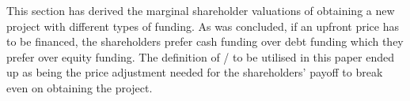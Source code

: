 \documentclass[main.tex]{subfiles}
\begin{document}
    This section has derived the marginal shareholder valuations of obtaining a new project
    with different types of funding.
    As was concluded, if an upfront price has to be financed,
    the shareholders prefer cash funding over debt funding
    which they prefer over equity funding.
    The definition of \FVA/ to be utilised in this paper ended up as being the price adjustment needed
    for the shareholders' payoff to break even on obtaining the project.
\end{document}
